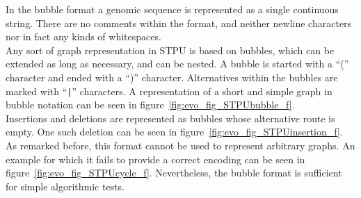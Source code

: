 \documentclass[a4paper,12pt,twoside,BCOR=10mm]{scrbook}
\def\pipe{\texttt{|}}
\begin{document}
In the bubble format a genomic sequence is represented as a single continuous string. 
There are no comments within the format, 
and neither newline characters nor in fact any kinds of whitespaces. \\
Any sort of graph representation in STPU is based on bubbles, which can be extended as long as necessary, 
and can be nested. A bubble is started with a “(” character and ended 
with a “)” character. Alternatives within the bubbles are marked with “{\!\pipe}” 
characters. 
A representation of a short and simple graph in bubble notation can be seen in figure~\ref{fig:evo_fig_STPUbubble_f}. \\
Insertions and deletions are represented as bubbles whose alternative route is empty. 
One such deletion can be seen in figure~\ref{fig:evo_fig_STPUinsertion_f}. \\
As remarked before, this format cannot be used to represent arbitrary graphs. 
An example for which it fails to provide a correct encoding can be seen in figure~\ref{fig:evo_fig_STPUcycle_f}. 
Nevertheless, the bubble format is sufficient for simple algorithmic tests.
\end{document}

